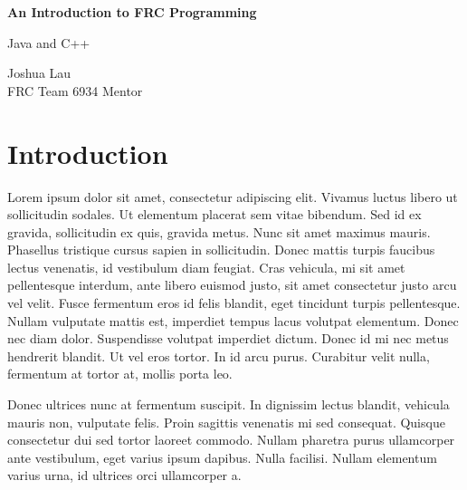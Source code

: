 \documentclass[12pt, letterpaper]{article}
\begin{document}
\begin{titlepage}
	\begin{center}
		\vspace*{1cm}

		\Huge
		\textbf{An Introduction to FRC Programming}

		\vspace{0.5cm}
		\Large
		Java and C++

		\vspace{1.5cm}

		\vfill

		Joshua Lau \\
		FRC Team 6934 Mentor
	\end{center}
\end{titlepage}


\newpage 

\begingroup
	\renewcommand\contentsname{Table of Contents}
	\tableofcontents
\endgroup

\newpage
{}

\section{Introduction}
Lorem ipsum dolor sit amet, consectetur adipiscing elit. Vivamus luctus libero ut sollicitudin sodales. Ut elementum placerat sem vitae bibendum. Sed id ex gravida, sollicitudin ex quis, gravida metus. Nunc sit amet maximus mauris. Phasellus tristique cursus sapien in sollicitudin. Donec mattis turpis faucibus lectus venenatis, id vestibulum diam feugiat. Cras vehicula, mi sit amet pellentesque interdum, ante libero euismod justo, sit amet consectetur justo arcu vel velit. Fusce fermentum eros id felis blandit, eget tincidunt turpis pellentesque. Nullam vulputate mattis est, imperdiet tempus lacus volutpat elementum. Donec nec diam dolor. Suspendisse volutpat imperdiet dictum. Donec id mi nec metus hendrerit blandit. Ut vel eros tortor. In id arcu purus. Curabitur velit nulla, fermentum at tortor at, mollis porta leo.

Donec ultrices nunc at fermentum suscipit. In dignissim lectus blandit, vehicula mauris non, vulputate felis. Proin sagittis venenatis mi sed consequat. Quisque consectetur dui sed tortor laoreet commodo. Nullam pharetra purus ullamcorper ante vestibulum, eget varius ipsum dapibus. Nulla facilisi. Nullam elementum varius urna, id ultrices orci ullamcorper a.
\end{document}
